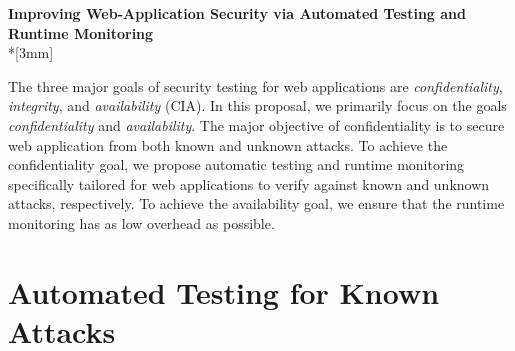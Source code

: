 \documentclass[times, 10pt,onecolumn]{article}
\begin{document}
\begin{center}
{\Large{\bf Improving Web-Application Security via Automated Testing and Runtime Monitoring}}\\*[3mm]
\end{center}

The three major goals of security testing for web applications are \emph{confidentiality}, \emph{integrity}, and \emph{availability} (CIA). In this proposal, we primarily focus on the goals \emph{confidentiality} and \emph{availability}. The major objective of confidentiality is to secure web application from both known and unknown attacks. To achieve the confidentiality goal, we propose automatic testing and runtime monitoring specifically tailored for web applications to verify against known and unknown attacks, respectively. To achieve the availability goal, we ensure that the runtime monitoring has as low overhead as possible.


\section{Automated Testing for Known Attacks}






\end{document}
